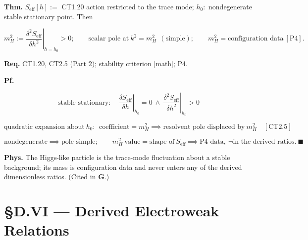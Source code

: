 \begin{theorem}\label{tag:EW-27}
\textbf{Thm.} $S_{\mathrm{eff}}[h]:=$ CT1.20 action restricted to the trace mode; $h_0:$ nondegenerate stable stationary point. Then

\[
m_H^2:=\left.\frac{\delta^2S_{\mathrm{eff}}}{\delta h^2}\right|_{h=h_0}>0;\qquad
\text{scalar pole at}\ k^2=m_H^2\ \ (\text{simple});\qquad
m_H^2=\text{configuration data}\ [\mathrm{P4}].
\]

\textbf{Req.} CT1.20, CT2.5 (Part 2); stability criterion [math]; P4.

\textbf{Pf.}

\[
\text{stable stationary}:\quad\left.\frac{\delta S_{\mathrm{eff}}}{\delta h}\right|_{h_0}=0\ \wedge\ \left.\frac{\delta^2S_{\mathrm{eff}}}{\delta h^2}\right|_{h_0}>0
\]

\[
\text{quadratic expansion about}\ h_0:\ \ \text{coefficient}=m_H^2\implies\text{resolvent pole displaced by}\ m_H^2\quad[\mathrm{CT2.5}]
\]

\[
\text{nondegenerate}\implies\text{pole simple};\qquad m_H^2\ \text{value}=\text{shape of}\ S_{\mathrm{eff}}\implies\text{P4 data},\ \neg\text{in the derived ratios}.\ \blacksquare
\]

\textbf{Phys.} The Higgs-like particle is the trace-mode fluctuation about a stable background; its mass is configuration data and never enters any of the derived dimensionless ratios. (Cited in \textbf{G}.)

\end{theorem}

\section[§D.VI — Derived Electroweak Relations]{\texorpdfstring{§D.VI — Derived Electroweak Relations}{SD.VI - Derived Electroweak Relations}}

